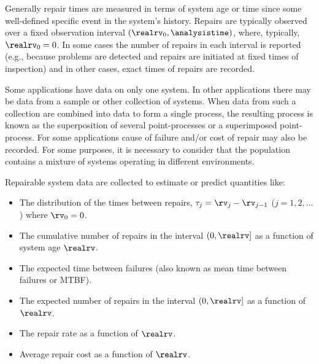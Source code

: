 Generally repair times are measured in
terms of system age or time since some well-defined specific event
in the system's history. Repairs are typically observed over a fixed
observation interval $(\realrv_{0},
\analysistime)$, where, typically,  
$\realrv_{0}=0$.  In some cases the number of repairs in each
interval is reported (e.g., because problems are detected and
repairs are initiated at fixed times of inspection) and in other
cases, exact times of repairs are recorded.


Some applications have data on only one system. In other
applications there may be data from a sample or other
collection of systems.  When data from such a collection are
combined into data to form a single process, the resulting process is
known as the superposition of several point-processes or a superimposed
point-process. For some applications cause of failure and/or
cost of repair may also be recorded.  For some purposes,
it is necessary to consider that the population contains a
mixture of systems operating in different environments.

Repairable system data are collected to estimate or predict quantities like:
\begin{itemize}
\item
The distribution of the times between 
repairs, $\tau_{j}=\rv_{j}-\rv_{j-1}$ ($j=1, 2, 
\dots$)
where $\rv_{0}=0$.
\item
The cumulative number of repairs in the interval
$(0, \realrv]$ as a function of system age $\realrv$.
\item
The expected time between failures (also known as mean time
between failures or MTBF).
\item
The expected number of repairs in the 
interval $(0, \realrv]$ as a function of~$\realrv$. 
\item
The repair  rate as a function of $\realrv$.
\item
Average repair cost as a function of $\realrv$.
\end{itemize}

